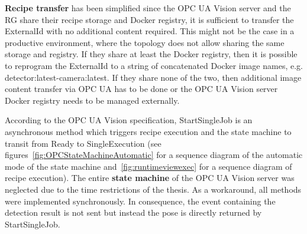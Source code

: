 \textbf{Recipe transfer} has been simplified since the OPC UA Vision server and the RG share their recipe storage and Docker registry, it is sufficient to transfer the ExternalId with no additional content required. This might not be the case in a productive environment, where the topology does not allow sharing the same storage and registry. If they share at least the Docker registry, then it is possible to reprogram the ExternalId to a string of concatenated Docker image names, e.g. detector:latest-camera:latest. If they share none of the two, then additional image content transfer via OPC UA has to be done or the OPC UA Vision server Docker registry needs to be managed externally.

According to the OPC UA Vision specification, StartSingleJob is an asynchronous method which triggers recipe execution and the state machine to transit from Ready to SingleExecution (see figures~\ref{fig:OPCStateMachineAutomatic} for a sequence diagram of the automatic mode of the state machine and~\ref{fig:runtimeviewexec} for a sequence diagram of recipe execution). The entire \textbf{state machine} of the OPC UA Vision server was neglected due to the time restrictions of the thesis. As a workaround, all methods were implemented synchronously. In consequence, the event containing the detection result is not sent but instead the pose is directly returned by StartSingleJob.


